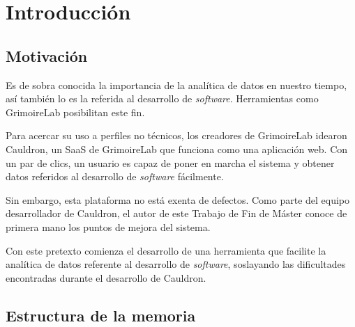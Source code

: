 
\chapter{Introducción} %

\label{Chapter1} %


\newcommand{\keyword}[1]{\textbf{#1}}
\newcommand{\tabhead}[1]{\textbf{#1}}
\newcommand{\code}[1]{\texttt{#1}}
\newcommand{\file}[1]{\texttt{\bfseries#1}}
\newcommand{\option}[1]{\texttt{\itshape#1}}


\section{Motivación}

Es de sobra conocida la importancia de la analítica de datos en nuestro tiempo, así también lo es la referida al desarrollo de \emph{software}. Herramientas como GrimoireLab posibilitan este fin.

Para acercar su uso a perfiles no técnicos, los creadores de GrimoireLab idearon Cauldron, un SaaS de GrimoireLab que funciona como una aplicación web. Con un par de clics, un usuario es capaz de poner en marcha el sistema y obtener datos referidos al desarrollo de \emph{software} fácilmente.

Sin embargo, esta plataforma no está exenta de defectos. Como parte del equipo desarrollador de Cauldron, el autor de este Trabajo de Fin de Máster conoce de primera mano los puntos de mejora del sistema.

Con este pretexto comienza el desarrollo de una herramienta que facilite la analítica de datos referente al desarrollo de \emph{software}, soslayando las dificultades encontradas durante el desarrollo de Cauldron.


\section{Estructura de la memoria}

